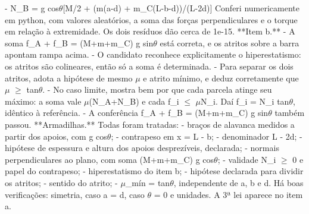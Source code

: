 \documentclass{article}%
\begin{document}
{-} N\_B = g cos$\theta${[}M/2 + (m(a-d) + m\_C(L-b-d))/(L-2d){]}\newline%
\newline%
Conferi numericamente em python, com valores aleatórios, a soma das forças perpendiculares e o torque em relação à extremidade. Os dois resíduos dão cerca de 1e{-}15.\newline%
\newline%
**Item b.**\newline%
{-} A soma f\_A + f\_B = (M+m+m\_C) g sin$\theta$ está correta, e os atritos sobre a barra apontam rampa acima.\newline%
{-} O candidato reconhece explicitamente o hiperestatismo: os atritos são colineares, então só a soma é determinada.\newline%
{-} Para separar os dois atritos, adota a hipótese de mesmo $\mu$ e atrito mínimo, e deduz corretamente que $\mu$ $\geq$ tan$\theta$.\newline%
{-} No caso limite, mostra bem por que cada parcela atinge seu máximo: a soma vale $\mu$(N\_A+N\_B) e cada f\_i $\leq$ $\mu$N\_i. Daí f\_i = N\_i tan$\theta$, idêntico à referência.\newline%
{-} A conferência f\_A + f\_B = (M+m+m\_C) g sin$\theta$ também passou.\newline%
\newline%
**Armadilhas.** Todas foram tratadas:\newline%
{-} braços de alavanca medidos a partir dos apoios, com g cos$\theta$;\newline%
{-} contrapeso em x = L - b;\newline%
{-} denominador L - 2d;\newline%
{-} hipótese de espessura e altura dos apoios desprezíveis, declarada;\newline%
{-} normais perpendiculares ao plano, com soma (M+m+m\_C) g cos$\theta$;\newline%
{-} validade N\_i $\geq$ 0 e papel do contrapeso;\newline%
{-} hiperestatismo do item b;\newline%
{-} hipótese declarada para dividir os atritos;\newline%
{-} sentido do atrito;\newline%
{-} $\mu$\_mín = tan$\theta$, independente de a, b e d.\newline%
\newline%
Há boas verificações: simetria, caso a = d, caso $\theta$ = 0 e unidades. A 3ª lei aparece no item a.\newline%
\end{document}
